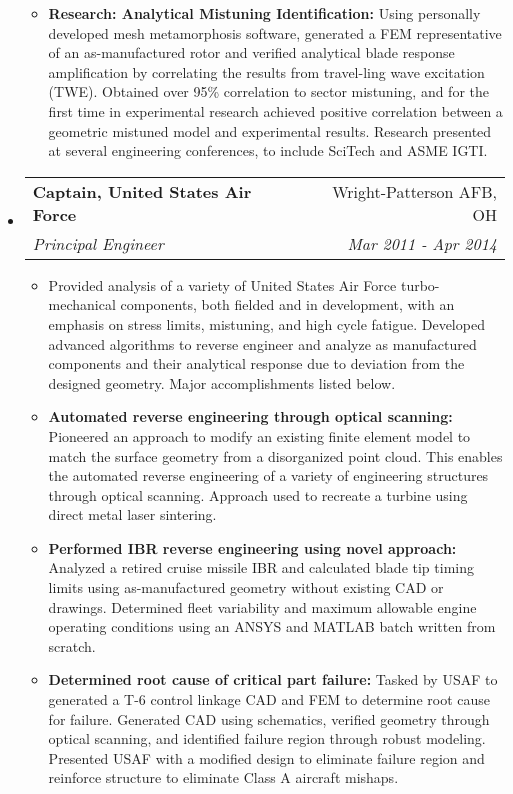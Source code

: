 \documentclass[letterpaper,11pt]{article}
\makeatletter
\newcommand{\resitem}[1]{\item #1 \vspace{-2pt}}
\newcommand{\ressubheading}[4]{
\begin{tabular*}{7.0in}{l@{\extracolsep{\fill}}r}
		\textbf{#1} & #2 \\
		\textit{#3} & \textit{#4} \\
\end{tabular*}\vspace{-6pt}}
\makeatother
\begin{document}
\begin{itemize}
\begin{itemize}
    \resitem{\textbf{Research: Analytical Mistuning Identification:} Using personally developed mesh metamorphosis software, generated a FEM representative of an as-manufactured rotor and verified analytical blade response amplification by correlating the results from travel-ling wave excitation (TWE).  Obtained over 95\% correlation to sector mistuning, and for the first time in experimental research achieved positive correlation between a geometric mistuned model and experimental results.  Research presented at several engineering conferences, to include SciTech and ASME IGTI.}
  \end{itemize}


\item
  \ressubheading{Captain, United States Air Force}{Wright-Patterson AFB, OH}{Principal Engineer}{Mar 2011 - Apr 2014}
  \begin{itemize}
    \resitem{Provided analysis of a variety of United States Air Force turbo-mechanical components, both fielded and in development, with an emphasis on stress limits, mistuning, and high cycle fatigue.  Developed advanced algorithms to reverse engineer and analyze as manufactured components and their analytical response due to deviation from the designed geometry.  Major accomplishments listed below.}
    \resitem{\textbf{Automated reverse engineering through optical scanning:}  Pioneered an approach to modify an existing finite element model to match the surface geometry from a disorganized point cloud.  This enables the automated reverse engineering	of a variety of engineering structures through optical scanning.  Approach used to recreate a turbine using direct metal laser sintering.}
    \resitem{\textbf{Performed IBR reverse engineering using novel approach:}  Analyzed a retired cruise missile IBR and calculated blade tip timing limits using as-manufactured geometry without existing CAD or drawings.  Determined fleet variability and maximum allowable engine operating conditions using an ANSYS and MATLAB batch written from scratch.}
    \resitem{\textbf{Determined root cause of critical part failure:}  Tasked by USAF to generated a T-6 control linkage CAD and FEM to determine root cause for failure.  Generated CAD using schematics, verified geometry through optical scanning, and identified failure region through robust modeling.  Presented USAF with a modified design to eliminate failure region and reinforce structure to eliminate Class A aircraft mishaps.}
  \end{itemize}

\end{itemize}
\end{document}
